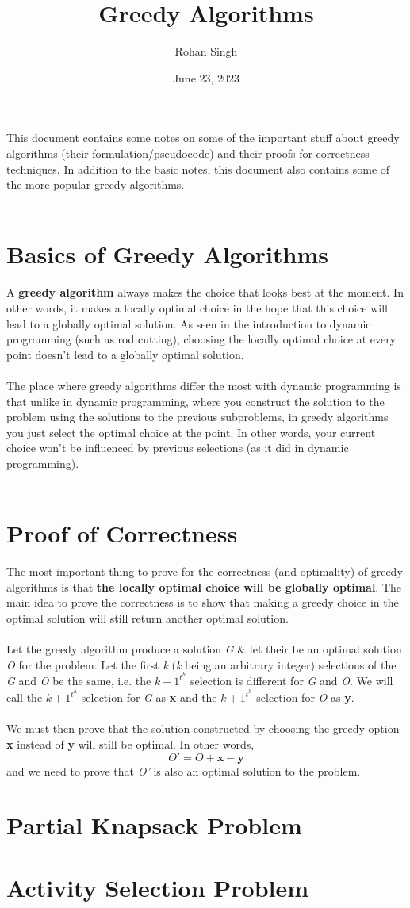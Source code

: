 \documentclass[12pt, letterpaper]{article}
\title{Greedy Algorithms}
\author{Rohan Singh}
\date{June 23, 2023}
\begin{document}
\maketitle
This document contains some notes on some of the important stuff about greedy algorithms (their formulation/pseudocode) and their proofs for correctness techniques. In addition to the basic notes, this document also contains some of the more popular greedy algorithms. \\\\

\section{Basics of Greedy Algorithms}

A \textbf{greedy algorithm} always makes the choice that looks best at the moment. In other words, it makes a locally optimal choice in the hope that this choice will lead to a globally optimal solution. As seen in the introduction to dynamic programming (such as rod cutting), choosing the locally optimal choice at every point doesn't lead to a globally optimal solution.\\\\
The place where greedy algorithms differ the most with dynamic programming is that unlike in dynamic programming, where you construct the solution to the problem using the solutions to the previous subproblems, in greedy algorithms you just select the optimal choice at the point. In other words, your current choice won't be influenced by previous selections (as it did in dynamic programming).\\\\

\section{Proof of Correctness}
The most important thing to prove for the correctness (and optimality) of greedy algorithms is that \textbf{the locally optimal choice will be globally optimal}. The main idea to prove the correctness is to show that making a greedy choice in the optimal solution will still return another optimal solution.\\\\
Let the greedy algorithm produce a solution \textit{G} $\&$ let their be an optimal solution \textit{O} for the problem. Let the first \textit{k} (\textit{k} being an arbitrary integer) selections of the \textit{G} and \textit{O} be the same, i.e. the $k+1^t^h$ selection is different for \textit{G} and \textit{O}. We will call the $k+1^t^h$ selection for \textit{G} as \textbf{x} and the $k+1^t^h$ selection for \textit{O} as \textbf{y}.\\\\
We must then prove that the solution constructed by choosing the greedy option \textbf{x} instead of \textbf{y} will still be optimal. In other words, $$O' = O + \textbf{x} - \textbf{y}$$ and we need to prove that \textit{O'} is also an optimal solution to the problem.

\section{Partial Knapsack Problem}

\section{Activity Selection Problem}
\end{document}
